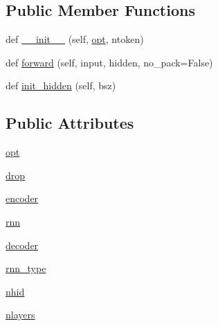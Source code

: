 \subsection*{Public Member Functions}
\begin{DoxyCompactItemize}
\item 
def \hyperlink{classparlai_1_1agents_1_1language__model_1_1modules_1_1RNNModel_ac96297bc86b58ccebf74b151e27e7d75}{\+\_\+\+\_\+init\+\_\+\+\_\+} (self, \hyperlink{classparlai_1_1agents_1_1language__model_1_1modules_1_1RNNModel_aee5d42f2cfdada7a6cc2cad2b712cca8}{opt}, ntoken)
\item 
def \hyperlink{classparlai_1_1agents_1_1language__model_1_1modules_1_1RNNModel_af937a59e142e0fe2fa94cabdfc14a7d0}{forward} (self, input, hidden, no\+\_\+pack=False)
\item 
def \hyperlink{classparlai_1_1agents_1_1language__model_1_1modules_1_1RNNModel_a5221545da5d46cb54bb2ab4d80246c35}{init\+\_\+hidden} (self, bsz)
\end{DoxyCompactItemize}
\subsection*{Public Attributes}
\begin{DoxyCompactItemize}
\item 
\hyperlink{classparlai_1_1agents_1_1language__model_1_1modules_1_1RNNModel_aee5d42f2cfdada7a6cc2cad2b712cca8}{opt}
\item 
\hyperlink{classparlai_1_1agents_1_1language__model_1_1modules_1_1RNNModel_aac342c5f6279b4de077793eecbdff823}{drop}
\item 
\hyperlink{classparlai_1_1agents_1_1language__model_1_1modules_1_1RNNModel_a40a2e161a2f4f1d78b1a7f55e5d4fc26}{encoder}
\item 
\hyperlink{classparlai_1_1agents_1_1language__model_1_1modules_1_1RNNModel_a961b0bd4d15bf0d858998e70eaf22f1d}{rnn}
\item 
\hyperlink{classparlai_1_1agents_1_1language__model_1_1modules_1_1RNNModel_a66e097f286de6aa1607505440b3931a5}{decoder}
\item 
\hyperlink{classparlai_1_1agents_1_1language__model_1_1modules_1_1RNNModel_ac277c84d2fe07dfcf0f629d321c7316a}{rnn\+\_\+type}
\item 
\hyperlink{classparlai_1_1agents_1_1language__model_1_1modules_1_1RNNModel_ab3b1a3929b7179ad99a7d027a4835fb9}{nhid}
\item 
\hyperlink{classparlai_1_1agents_1_1language__model_1_1modules_1_1RNNModel_aea0cbdfaccd4ee22812128cf06e31aeb}{nlayers}
\end{DoxyCompactItemize}


